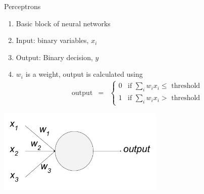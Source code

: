 \documentclass[handout]{beamer}
\begin{document}
\begin{frame}{Perceptrons}
\begin{enumerate}
  \item Basic block of neural networks \\

  \item Input: binary variables, $x_i$ \\

  \item Output: Binary decision, $y$ \\

  \item $w_i$ is a weight, output is calculated using \\

  \begin{eqnarray}
  \mbox{output} & = & \left\{ \begin{array}{ll}
      0 & \mbox{if } \sum_i w_i x_i \leq \mbox{ threshold} \\
      1 & \mbox{if } \sum_i w_i x_i > \mbox{ threshold}
      \end{array} \right.
\tag{1}\end{eqnarray}
\end{enumerate}
    \begin{center}
      \includegraphics[width=0.8\linewidth, height=4cm]{images/perceptron}
    \end{center}
\end{frame}
\end{document}
